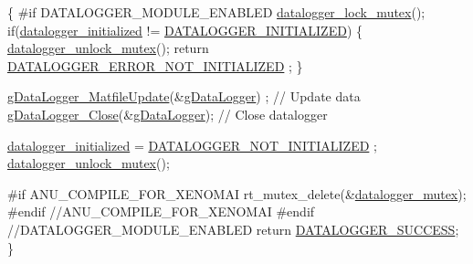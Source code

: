 \begin{DoxyCode}
\{
\textcolor{preprocessor}{    #if DATALOGGER\_MODULE\_ENABLED}
\textcolor{preprocessor}{}        \hyperlink{datalogger_01_07Caio-PC's_01conflicted_01copy_012012-11-23_08_8c_a54b06d9395b2e370a5a72beb7f9524b2}{datalogger\_lock\_mutex}();
        \textcolor{keywordflow}{if}(\hyperlink{datalogger_01_07Caio-PC's_01conflicted_01copy_012012-11-23_08_8c_a35e8fbe04b90452afdc3c1be16ff6187}{datalogger\_initialized} != 
      \hyperlink{datalogger_01_07Caio-PC's_01conflicted_01copy_012012-11-23_08_8h_a684c343d340004b77ca2b782934c96ca}{DATALOGGER\_INITIALIZED})
    \{
            \hyperlink{datalogger_01_07Caio-PC's_01conflicted_01copy_012012-11-23_08_8c_a85453211c0c809083c36cc56b275aeeb}{datalogger\_unlock\_mutex}();
        \textcolor{keywordflow}{return} \hyperlink{datalogger_01_07Caio-PC's_01conflicted_01copy_012012-11-23_08_8h_a60df7fe0e61b757ad6a9db106b0eb43e}{DATALOGGER\_ERROR\_NOT\_INITIALIZED}
      ;
    \}

    \hyperlink{gdatalogger_8c_a05dc8ce832b941280d7de26057992640}{gDataLogger\_MatfileUpdate}(&\hyperlink{datalogger_01_07Caio-PC's_01conflicted_01copy_012012-11-23_08_8c_abe3b9c2c4e21e79c7b046b5986d13acc}{gDataLogger})
      ; \textcolor{comment}{// Update data}
    \hyperlink{gdatalogger_8c_a0ac95f84c6ee484c4ad0351530f1c468}{gDataLogger\_Close}(&\hyperlink{datalogger_01_07Caio-PC's_01conflicted_01copy_012012-11-23_08_8c_abe3b9c2c4e21e79c7b046b5986d13acc}{gDataLogger}); \textcolor{comment}{// Close
       datalogger}

    \hyperlink{datalogger_01_07Caio-PC's_01conflicted_01copy_012012-11-23_08_8c_a35e8fbe04b90452afdc3c1be16ff6187}{datalogger\_initialized} = \hyperlink{datalogger_01_07Caio-PC's_01conflicted_01copy_012012-11-23_08_8h_a4602a65fdfa920dfe832cfa50b7ee4c8}{DATALOGGER\_NOT\_INITIALIZED}
      ;
    \hyperlink{datalogger_01_07Caio-PC's_01conflicted_01copy_012012-11-23_08_8c_a85453211c0c809083c36cc56b275aeeb}{datalogger\_unlock\_mutex}();

\textcolor{preprocessor}{        #if ANU\_COMPILE\_FOR\_XENOMAI}
\textcolor{preprocessor}{}    rt\_mutex\_delete(&\hyperlink{datalogger_01_07Caio-PC's_01conflicted_01copy_012012-11-23_08_8c_a824d6f7fd1d3898ba0b1100ba37875c6}{datalogger\_mutex});
\textcolor{preprocessor}{        #endif  //ANU\_COMPILE\_FOR\_XENOMAI}
\textcolor{preprocessor}{}
\textcolor{preprocessor}{    #endif //DATALOGGER\_MODULE\_ENABLED}
\textcolor{preprocessor}{}
    \textcolor{keywordflow}{return} \hyperlink{datalogger_01_07Caio-PC's_01conflicted_01copy_012012-11-23_08_8h_abddebaf71d26d40183fccbb1a766b983}{DATALOGGER\_SUCCESS};
\}
\end{DoxyCode}
